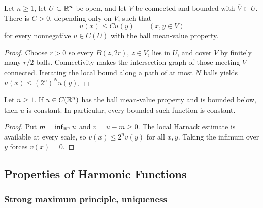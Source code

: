 \begin{theorem}
\label{thm:harnack-global-mvp}





Let $n\ge1$, let $U\subset\mathbb{R}^n$ be open, and let $V$ be connected and bounded
with $\overline V\subset U$. There is $C>0$, depending only on $V$, such that
$$u(x)\le C u(y)\qquad(x,y\in V)$$
for every nonnegative $u\in C(U)$ with the ball mean-value property.
\end{theorem}
\begin{proof}

\sketch Choose $r>0$ so every $B(z,2r)$, $z\in\overline V$, lies in $U$, and
cover $\overline V$ by finitely many $r/2$-balls. Connectivity makes the
intersection graph of those meeting $V$ connected. Iterating the local bound
along a path of at most $N$ balls yields $u(x)\le(2^n)^N u(y)$.
\end{proof}

\begin{theorem}
\label{thm:liouville-mvp}





Let $n\ge1$. If $u\in C(\mathbb{R}^n)$ has the ball mean-value property and is bounded
below, then $u$ is constant. In particular, every bounded such function is
constant.
\end{theorem}
\begin{proof}

\sketch Put $m=\inf_{\mathbb{R}^n}u$ and $v=u-m\ge0$. The local Harnack estimate is
available at every scale, so $v(x)\le2^n v(y)$ for all $x,y$. Taking the
infimum over $y$ forces $v(x)=0$.
\end{proof}

\subsection{Properties of Harmonic Functions}
\label{sec:laplace-properties-harmonic-functions}

\subsubsection{Strong maximum principle, uniqueness}
\label{sec:laplace-strong-maximum-principle}

